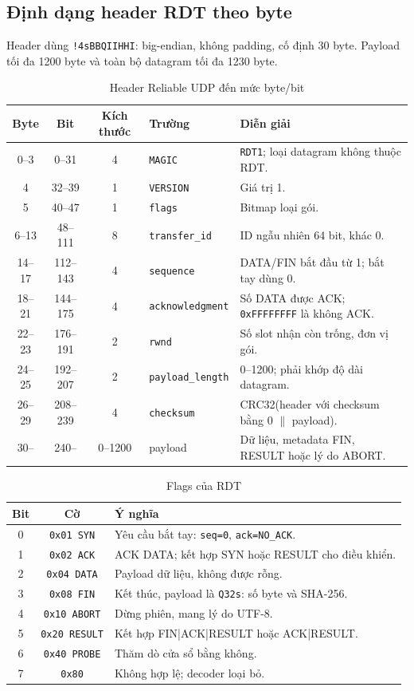 \subsection{Định dạng header RDT theo byte}
Header dùng \texttt{!4sBBQIIHHI}: big-endian, không padding, cố định 30 byte. 
Payload tối đa 1200 byte và toàn bộ datagram tối đa 1230 byte.
\begin{table}[H]\centering\small\renewcommand{\arraystretch}{1.25}
\begin{tabular}{|c|c|c|p{2.3cm}|p{6.0cm}|}\hline
\textbf{Byte}&\textbf{Bit}&\textbf{Kích thước}&\textbf{Trường}&\textbf{Diễn giải}\\\hline
0--3&0--31&4&\texttt{MAGIC}&\texttt{RDT1}; loại datagram không thuộc RDT.\\\hline
4&32--39&1&\texttt{VERSION}&Giá trị 1.\\\hline
5&40--47&1&\texttt{flags}&Bitmap loại gói.\\\hline
6--13&48--111&8&\texttt{transfer\_id}&ID ngẫu nhiên 64 bit, khác 0.\\\hline
14--17&112--143&4&\texttt{sequence}&DATA/FIN bắt đầu từ 1; bắt tay dùng 0.\\\hline
18--21&144--175&4&\texttt{acknowledgment}&Số DATA được ACK; \texttt{0xFFFFFFFF} là không ACK.\\\hline
22--23&176--191&2&\texttt{rwnd}&Số slot nhận còn trống, đơn vị gói.\\\hline
24--25&192--207&2&\texttt{payload\_length}&0--1200; phải khớp độ dài datagram.\\\hline
26--29&208--239&4&\texttt{checksum}&CRC32(header với checksum bằng 0 $\|$ payload).\\\hline
30--&240--&0--1200&payload&Dữ liệu, metadata FIN, RESULT hoặc lý do ABORT.\\\hline
\end{tabular}\caption{Header Reliable UDP đến mức byte/bit}\label{tab:rdt-header}\end{table}

\begin{table}[H]\centering\small
\begin{tabular}{|c|c|p{8.5cm}|}\hline
\textbf{Bit}&\textbf{Cờ}&\textbf{Ý nghĩa}\\\hline
0&\texttt{0x01 SYN}&Yêu cầu bắt tay: \texttt{seq=0}, \texttt{ack=NO\_ACK}.\\\hline
1&\texttt{0x02 ACK}&ACK DATA; kết hợp SYN hoặc RESULT cho điều khiển.\\\hline
2&\texttt{0x04 DATA}&Payload dữ liệu, không được rỗng.\\\hline
3&\texttt{0x08 FIN}&Kết thúc, payload là \texttt{Q32s}: số byte và SHA-256.\\\hline
4&\texttt{0x10 ABORT}&Dừng phiên, mang lý do UTF-8.\\\hline
5&\texttt{0x20 RESULT}&Kết hợp FIN|ACK|RESULT hoặc ACK|RESULT.\\\hline
6&\texttt{0x40 PROBE}&Thăm dò cửa sổ bằng không.\\\hline
7&\texttt{0x80}&Không hợp lệ; decoder loại bỏ.\\\hline
\end{tabular}\caption{Flags của RDT}\label{tab:rdt-flags}\end{table}
